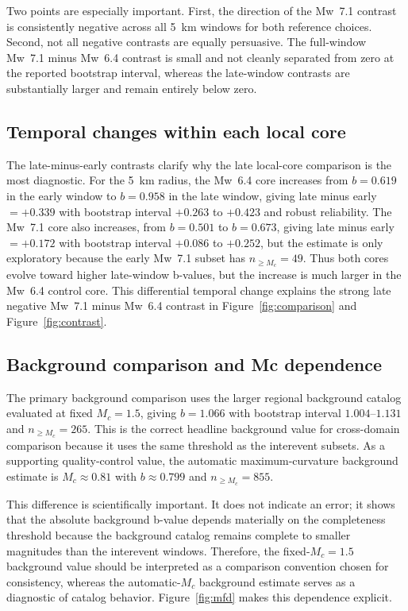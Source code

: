 \documentclass[11pt]{article}
\begin{document}
Two points are especially important. First, the direction of the Mw~7.1 contrast is consistently negative across all 5~km windows for both reference choices. Second, not all negative contrasts are equally persuasive. The full-window Mw~7.1 minus Mw~6.4 contrast is small and not cleanly separated from zero at the reported bootstrap interval, whereas the late-window contrasts are substantially larger and remain entirely below zero.

\subsection{Temporal changes within each local core}
The late-minus-early contrasts clarify why the late local-core comparison is the most diagnostic. For the 5~km radius, the Mw~6.4 core increases from $b=0.619$ in the early window to $b=0.958$ in the late window, giving late minus early $=+0.339$ with bootstrap interval $+0.263$ to $+0.423$ and robust reliability. The Mw~7.1 core also increases, from $b=0.501$ to $b=0.673$, giving late minus early $=+0.172$ with bootstrap interval $+0.086$ to $+0.252$, but the estimate is only exploratory because the early Mw~7.1 subset has $n_{\ge M_c}=49$. Thus both cores evolve toward higher late-window b-values, but the increase is much larger in the Mw~6.4 control core. This differential temporal change explains the strong late negative Mw~7.1 minus Mw~6.4 contrast in Figure~\ref{fig:comparison} and Figure~\ref{fig:contrast}.

\subsection{Background comparison and Mc dependence}
The primary background comparison uses the larger regional background catalog evaluated at fixed $M_c=1.5$, giving $b=1.066$ with bootstrap interval $1.004$--$1.131$ and $n_{\ge M_c}=265$. This is the correct headline background value for cross-domain comparison because it uses the same threshold as the interevent subsets. As a supporting quality-control value, the automatic maximum-curvature background estimate is $M_c\approx 0.81$ with $b\approx 0.799$ and $n_{\ge M_c}=855$.

This difference is scientifically important. It does not indicate an error; it shows that the absolute background b-value depends materially on the completeness threshold because the background catalog remains complete to smaller magnitudes than the interevent windows. Therefore, the fixed-$M_c=1.5$ background value should be interpreted as a comparison convention chosen for consistency, whereas the automatic-$M_c$ background estimate serves as a diagnostic of catalog behavior. Figure~\ref{fig:mfd} makes this dependence explicit.
\end{document}

